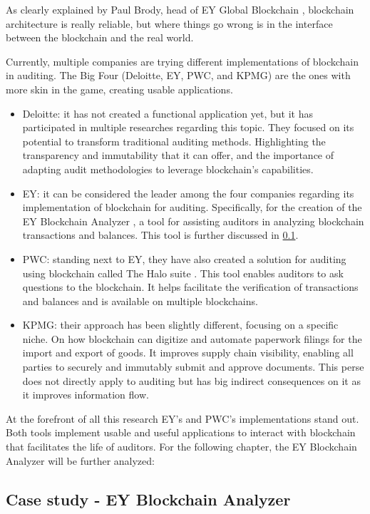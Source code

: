 As clearly explained by Paul Brody, head of EY Global Blockchain \cite{ey_blockchain_explorer}, blockchain architecture is really reliable, but where things go wrong is in the interface between the blockchain and the real world. 

Currently, multiple companies are trying different implementations of blockchain in auditing. The Big Four (Deloitte, EY, PWC, and KPMG) are the ones with more skin in the game, creating usable applications. 
\begin{itemize}
    \item Deloitte: it has not created a functional application yet, but it has participated in multiple researches regarding this topic. They focused on its potential to transform traditional auditing methods. Highlighting the transparency and immutability that it can offer, and the importance of adapting audit methodologies to leverage blockchain’s capabilities.
    \item EY: it can be considered the leader among the four companies regarding its implementation of blockchain for auditing. Specifically, for the creation of the EY Blockchain Analyzer \cite{EYBlockchainAnalyzer}, a tool for assisting auditors in analyzing blockchain transactions and balances. This tool is further discussed in \cref{sub: EY case}.
    \item PWC: standing next to EY, they have also created a solution for auditing using blockchain called The Halo suite \cite{pwc_halo_cryptocurrency}. This tool enables auditors to ask questions to the blockchain. It helps facilitate the verification of transactions and balances and is available on multiple blockchains. 
    \item KPMG: their approach has been slightly different, focusing on a specific niche. On how blockchain can digitize and automate paperwork filings for the import and export of goods. It improves supply chain visibility, enabling all parties to securely and immutably submit and approve documents. This perse does not directly apply to auditing but has big indirect consequences on it as it improves information flow. 
\end{itemize}


At the forefront of all this research EY's and PWC's implementations stand out. Both tools implement usable and useful applications to interact with blockchain that facilitates the life of auditors. For the following chapter, the EY Blockchain Analyzer will be further analyzed:

\subsection{Case study - EY Blockchain Analyzer}
\label{sub: EY case}

